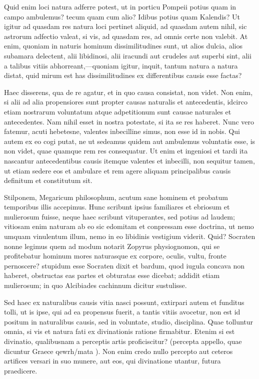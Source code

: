  Quid enim loci natura adferre potest, ut in porticu Pompeii potius quam in campo ambulemus? tecum quam cum alio? Idibus potius quam Kalendis? Ut igitur ad quasdam res natura loci pertinet aliquid, ad quasdam autem nihil, sic astrorum adfectio valeat, si vis, ad quasdam res, ad omnis certe non valebit. At enim, quoniam in naturis hominum dissimilitudines sunt, ut alios dulcia, alios subamara delectent, alii libidinosi, alii iracundi aut crudeles aut superbi sint, alii a talibus vitiis abhorreant,—quoniam igitur, inquit, tantum natura a natura distat, quid mirum est has dissimilitudines ex differentibus causis esse factas?

 Haec disserens, qua de re agatur, et in quo causa consistat, non videt. Non enim, si alii ad alia propensiores sunt propter causas naturalis et antecedentis, idcirco etiam nostrarum voluntatum atque adpetitionum sunt causae naturales et antecedentes. Nam nihil esset in nostra potestate, si ita se res haberet. Nunc vero fatemur, acuti hebetesne, valentes inbecilline simus, non esse id in nobis. Qui autem ex eo cogi putat, ne ut sedeamus quidem aut ambulemus voluntatis esse, is non videt, quae quamque rem res consequatur. Ut enim et ingeniosi et tardi ita nascantur antecedentibus causis itemque valentes et inbecilli, non sequitur tamen, ut etiam sedere eos et ambulare et rem agere aliquam principalibus causis definitum et constitutum sit.

 Stilponem, Megaricum philosophum, acutum sane hominem et probatum temporibus illis accepimus. Hunc scribunt ipsius familiares et ebriosum et mulierosum fuisse, neque haec scribunt vituperantes, sed potius ad laudem; vitiosam enim naturam ab eo sic edomitam et conpressam esse doctrina, ut nemo umquam vinulentum illum, nemo in eo libidinis vestigium viderit. Quid? Socraten nonne legimus quem ad modum notarit Zopyrus physiognomon, qui se profitebatur hominum mores naturasque ex corpore, oculis, vultu, fronte pernoscere? stupidum esse Socraten dixit et bardum, quod iugula concava non haberet, obstructas eas partes et obturatas esse dicebat; addidit etiam mulierosum; in quo Alcibiades cachinnum dicitur sustulisse.

 Sed haec ex naturalibus causis vitia nasci possunt, extirpari autem et funditus tolli, ut is ipse, qui ad ea propensus fuerit, a tantis vitiis avocetur, non est id positum in naturalibus causis, sed in voluntate, studio, disciplina. Quae tolluntur omnia, si vis et natura fati ex divinationis ratione firmabitur. Etenim si est divinatio, qualibusnam a perceptis artis proficiscitur? (percepta appello, quae dicuntur Graece qewrh/mata ). Non enim credo nullo percepto aut ceteros artifices versari in suo munere, aut eos, qui divinatione utantur, futura praedicere.

